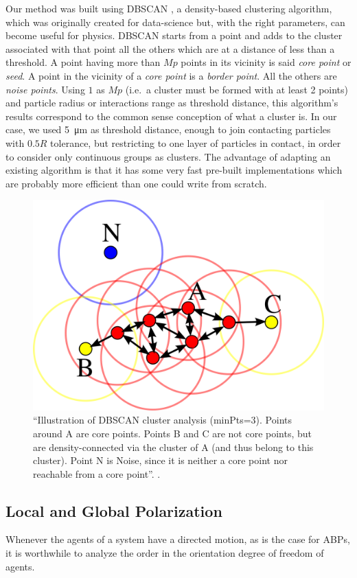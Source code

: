 \documentclass[../../master_thesis_np.tex]{subfiles}
\begin{document}
		Our method was built using DBSCAN \cite{ester_density-based_1996}, a density-based clustering algorithm, which was originally created for data-science but, with the right parameters, can become useful for physics. 
		DBSCAN starts from a point and adds to the cluster associated with that point all the others which are at a distance of less than a threshold. 
		A point having more than $Mp$ points in its vicinity is said \emph{core point} or \emph{seed}. 
		A point in the vicinity of a \emph{core point} is a \emph{border point}. 
		All the others are \emph{noise points}. 
		Using $1$ as $Mp$ (i.e.\ a cluster must be formed with at least 2 points) and particle radius or interactions range as threshold distance, this algorithm's results correspond to the common sense conception of what a cluster is.
		In our case, we used \SI{5}{\um} as threshold distance, enough to join contacting particles with $0.5R$ tolerance, but restricting to one layer of particles in contact, in order to consider only continuous groups as clusters.
		The advantage of adapting an existing algorithm is that it has some very fast pre-built implementations which are probably more efficient than one could write from scratch.
		
		\begin{figure}[htp]
			\centering
			\includegraphics[width=.75\textwidth]{dbscan.png}
			\caption{\enquote{Illustration of DBSCAN cluster analysis (minPts=3). Points around A are core points. Points B and C are not core points, but are density-connected via the cluster of A (and thus belong to this cluster). Point N is Noise, since it is neither a core point nor reachable from a core point}. \cite{chire_deutsch_2011}.}
			\label{fig:dbscan}
		\end{figure}
		
		\subsection{Local and Global Polarization}
		Whenever the agents of a system have a directed motion, as is the case for ABPs, it is worthwhile to analyze the order in the orientation degree of freedom of agents.  
		
\end{document}
